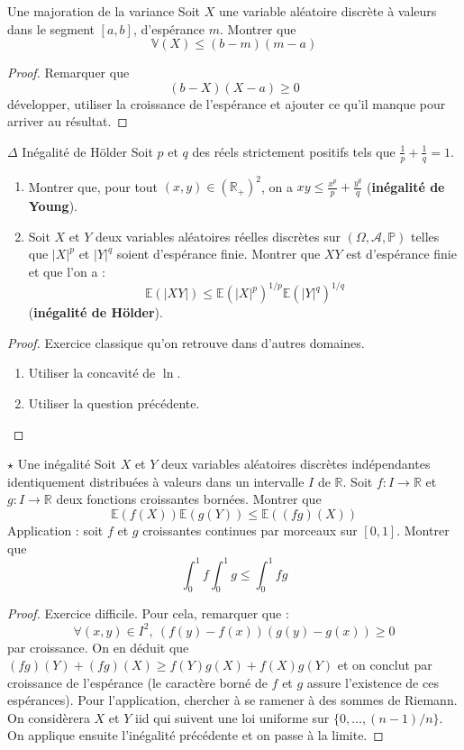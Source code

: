 \documentclass[french,a4paper]{article}
\renewcommand{\P}{\mathbb{P}}
\newcommand{\R}{\mathbb{R}}
\newcommand{\E}{\mathbb{E}}
\newcommand{\V}{\mathbb{V}}
\theoremstyle{plain}
\theoremstyle{definition}
\theoremstyle{remark}
\begin{document}
\begin{ex}{Une majoration de la variance}
	Soit $X$ une variable aléatoire discrète à valeurs dans le segment $[a,b]$, d'espérance $m$. Montrer que $$\V(X)\leqslant(b-m)(m-a)$$
\end{ex}
\begin{proof}
	Remarquer que $$(b-X)(X-a)\geqslant0$$ développer, utiliser la croissance de l'espérance et ajouter ce qu'il manque pour arriver au résultat.
\end{proof}

\begin{ex}{$\Delta$ Inégalité de Hölder}
	Soit $p$ et $q$ des réels strictement positifs tels que $\displaystyle\frac{1}{p}+\frac{1}{q}=1$.
	\begin{enumerate}
		\item Montrer que, pour tout $(x,y)\in(\R_+)^2$, on a $\displaystyle xy\leqslant\frac{x^p}{p}+\frac{y^q}{q}$ (\textbf{inégalité de Young}).
		\item Soit $X$ et $Y$ deux variables aléatoires réelles discrètes sur $(\Omega,\mathcal{A},\P)$ telles que $\lvert X\rvert^p$ et $\lvert Y\rvert^q$ soient d'espérance finie. Montrer que $XY$ est d'espérance finie et que l'on a : $$\E(\lvert XY\rvert)\leqslant\E(\lvert X\rvert^p)^{1/p}\E(\lvert Y\rvert^q)^{1/q}$$ (\textbf{inégalité de Hölder}).
	\end{enumerate}
\end{ex}
\begin{proof}
	Exercice classique qu'on retrouve dans d'autres domaines.
	\begin{enumerate}
		\item Utiliser la concavité de $\ln$.
		\item Utiliser la question précédente.
	\end{enumerate}
\end{proof}

\begin{ex}{$\star$ Une inégalité}
	Soit $X$ et $Y$ deux variables aléatoires discrètes indépendantes identiquement distribuées à valeurs dans un intervalle $I$ de $\R$. Soit $f:I\to\R$ et $g:I\to\R$ deux fonctions croissantes bornées. Montrer que $$\E(f(X))\E(g(Y))\leqslant\E((fg)(X))$$ Application : soit $f$ et $g$ croissantes continues par morceaux sur $[0,1]$. Montrer que $$\int_{0}^{1}f\int_{0}^{1}g\leqslant\int_{0}^{1}fg$$
\end{ex}
\begin{proof}
	Exercice difficile. Pour cela, remarquer que : $$\forall(x,y)\in I^2,\ (f(y)-f(x))(g(y)-g(x))\geqslant0$$ par croissance. On en déduit que $(fg)(Y)+(fg)(X)\geqslant f(Y)g(X)+f(X)g(Y)$ et on conclut par croissance de l'espérance (le caractère borné de $f$ et $g$ assure l'existence de ces espérances). Pour l'application, chercher à se ramener à des sommes de Riemann. On considèrera $X$ et $Y$ iid qui suivent une loi uniforme sur $\{0,\ldots,(n-1)/n\}$. On applique ensuite l'inégalité précédente et on passe à la limite.
\end{proof}
\end{document}
